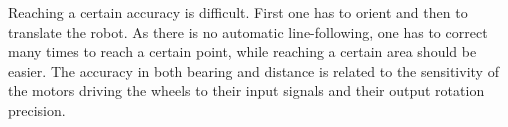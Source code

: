 Reaching a certain accuracy is difficult. First one has to
orient and then to translate the robot. As there is no automatic line-following,
one has to correct many times to reach a certain point, while reaching a certain
area should be easier. The accuracy in both bearing and distance is related
to the sensitivity of the motors driving the wheels to their input signals and
their output rotation precision.
